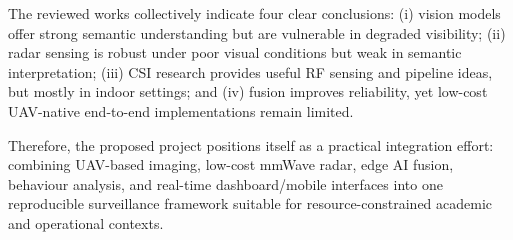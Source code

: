 The reviewed works collectively indicate four clear conclusions:  
(i) vision models offer strong semantic understanding but are vulnerable in degraded visibility;  
(ii) radar sensing is robust under poor visual conditions but weak in semantic interpretation;  
(iii) CSI research provides useful RF sensing and pipeline ideas, but mostly in indoor settings; and  
(iv) fusion improves reliability, yet low-cost UAV-native end-to-end implementations remain limited.

Therefore, the proposed project positions itself as a practical integration effort: combining UAV-based imaging, low-cost mmWave radar, edge AI fusion, behaviour analysis, and real-time dashboard/mobile interfaces into one reproducible surveillance framework suitable for resource-constrained academic and operational contexts.